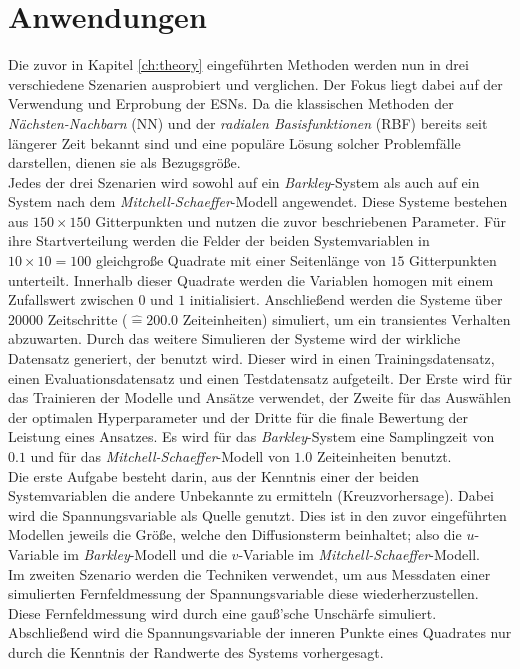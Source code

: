 \chapter{Anwendungen}
\label{ch:experiments}
Die zuvor in Kapitel \ref{ch:theory} eingeführten Methoden werden nun in drei verschiedene Szenarien ausprobiert und verglichen. Der Fokus liegt dabei auf der Verwendung und Erprobung der \textsc{ESN}s. Da die klassischen Methoden der \textit{Nächsten-Nachbarn} (\textsc{NN}) und der \textit{radialen Basisfunktionen} (\textsc{RBF}) bereits seit längerer Zeit bekannt sind und eine populäre Lösung solcher Problemfälle darstellen, dienen sie als Bezugsgröße.\\

Jedes der drei Szenarien wird sowohl auf ein \textit{Barkley}-System als auch auf ein System nach dem \textit{Mitchell-Schaeffer}-Modell angewendet. Diese Systeme bestehen aus $150 \times 150$ Gitterpunkten und nutzen die zuvor beschriebenen Parameter. Für ihre Startverteilung werden die Felder der beiden Systemvariablen in $10 \times 10 = 100$ gleichgroße Quadrate mit einer Seitenlänge von $15$ Gitterpunkten unterteilt. Innerhalb dieser Quadrate werden die Variablen homogen mit einem Zufallswert zwischen $0$ und $1$ initialisiert. Anschließend werden die Systeme über $20000$ Zeitschritte ($\widehat{=} 200.0$ Zeiteinheiten) simuliert, um ein transientes Verhalten abzuwarten. Durch das weitere Simulieren der Systeme wird der wirkliche Datensatz generiert, der benutzt wird. Dieser wird in einen Trainingsdatensatz, einen Evaluationsdatensatz und einen Testdatensatz aufgeteilt. Der Erste wird für das Trainieren der Modelle und Ansätze verwendet, der Zweite für das Auswählen der optimalen Hyperparameter und der Dritte für die finale Bewertung der Leistung eines Ansatzes. Es wird für das \textit{Barkley}-System eine Samplingzeit von $0.1$ und für das \textit{Mitchell-Schaeffer}-Modell von $1.0$ Zeiteinheiten benutzt.\\
 
Die erste Aufgabe besteht darin, aus der Kenntnis einer der beiden Systemvariablen die andere Unbekannte zu ermitteln (Kreuzvorhersage). Dabei wird die Spannungsvariable als Quelle genutzt. Dies ist in den zuvor eingeführten Modellen jeweils die Größe, welche den Diffusionsterm beinhaltet; also die $u$-Variable im \textit{Barkley}-Modell und die $v$-Variable im \textit{Mitchell-Schaeffer}-Modell.\\
Im zweiten Szenario werden die Techniken verwendet, um aus Messdaten einer simulierten Fernfeldmessung der Spannungsvariable  diese wiederherzustellen. Diese Fernfeldmessung wird durch eine gauß'sche Unschärfe simuliert.\\
Abschließend wird die Spannungsvariable der inneren Punkte eines Quadrates nur durch die Kenntnis der Randwerte des Systems vorhergesagt.\\

